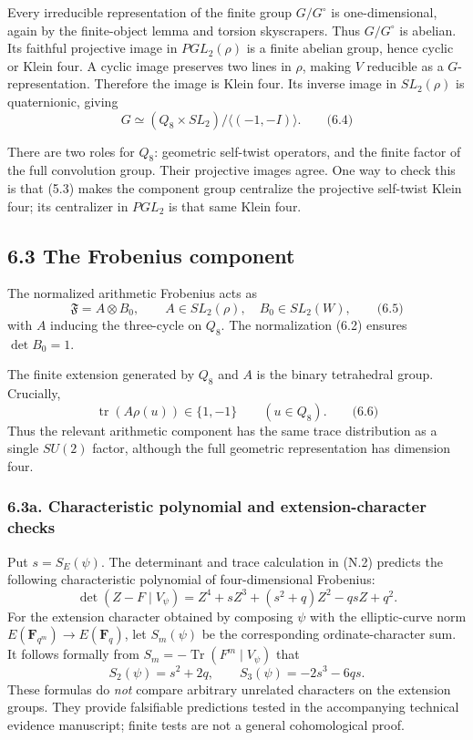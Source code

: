 \documentclass[
  11pt,
  a4paper,
]{article}
\begin{document}
Every irreducible representation of the finite group \(G/G^\circ\) is
one-dimensional, again by the finite-object lemma and torsion
skyscrapers. Thus \(G/G^\circ\) is abelian. Its faithful projective
image in \(PGL_2(\rho)\) is a finite abelian group, hence cyclic or
Klein four. A cyclic image preserves two lines in \(\rho\), making \(V\)
reducible as a \(G\)-representation. Therefore the image is Klein four.
Its inverse image in \(SL_2(\rho)\) is quaternionic, giving \[
\boxed{
G\simeq
(Q_8\times SL_2)/\langle(-1,-I)\rangle.
}
\qquad \text{(6.4)}
\]

There are two roles for \(Q_8\): geometric self-twist operators, and the
finite factor of the full convolution group. Their projective images
agree. One way to check this is that (5.3) makes the component group
centralize the projective self-twist Klein four; its centralizer in
\(PGL_2\) is that same Klein four.

\subsection{6.3 The Frobenius component}\label{the-frobenius-component}

The normalized arithmetic Frobenius acts as \[
\mathfrak F=A\otimes B_0,
\qquad A\in SL_2(\rho),\quad B_0\in SL_2(W),
\qquad \text{(6.5)}
\] with \(A\) inducing the three-cycle on \(Q_8\). The normalization
(6.2) ensures \(\det B_0=1\).

The finite extension generated by \(Q_8\) and \(A\) is the binary
tetrahedral group. Crucially, \[
\operatorname{tr}(A\rho(u))\in\{1,-1\}
\qquad(u\in Q_8).
\qquad \text{(6.6)}
\] Thus the relevant arithmetic component has the same trace
distribution as a single \(SU(2)\) factor, although the full geometric
representation has dimension four.


\subsubsection{6.3a. Characteristic polynomial and extension-character checks}
Put \(s=S_E(\psi)\). The determinant and trace calculation in (N.2)
predicts the following characteristic polynomial of four-dimensional
Frobenius:
\[
\boxed{\det(Z-F\mid V_\psi)
 =Z^4+sZ^3+(s^2+q)Z^2-qsZ+q^2.}
\tag{N.3}
\]
For the extension character obtained by composing \(\psi\) with the
elliptic-curve norm \(E(\mathbf F_{q^m})\to E(\mathbf F_q)\), let
\(S_m(\psi)\) be the corresponding ordinate-character sum. It follows
formally from \(S_m=-\operatorname{Tr}(F^m\mid V_\psi)\) that
\[
\boxed{S_2(\psi)=s^2+2q,\qquad S_3(\psi)=-2s^3-6qs.}
\tag{N.4}
\]
These formulas do \emph{not} compare arbitrary unrelated characters
on the extension groups. They provide falsifiable predictions tested
in the accompanying technical evidence manuscript; finite tests are
not a general cohomological proof.
\end{document}
